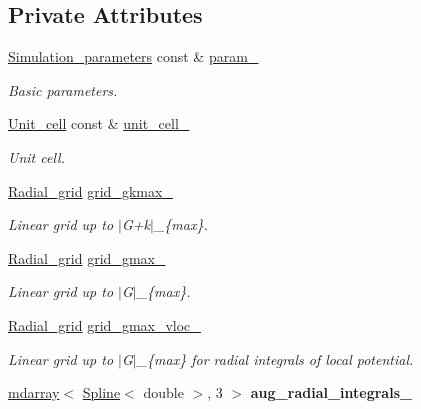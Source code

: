 \subsection*{Private Attributes}
\begin{DoxyCompactItemize}
\item 
\hyperlink{classsirius_1_1_simulation__parameters}{Simulation\+\_\+parameters} const \& \hyperlink{classsirius_1_1_radial__integrals_a88e8521b4204f08956b481ef8d4687c3}{param\+\_\+}
\begin{DoxyCompactList}\small\item\em Basic parameters. \end{DoxyCompactList}\item 
\hyperlink{classsirius_1_1_unit__cell}{Unit\+\_\+cell} const \& \hyperlink{classsirius_1_1_radial__integrals_ae644346b2e6a36a6c281ad577efcc5d8}{unit\+\_\+cell\+\_\+}
\begin{DoxyCompactList}\small\item\em Unit cell. \end{DoxyCompactList}\item 
\hyperlink{classsirius_1_1_radial__grid}{Radial\+\_\+grid} \hyperlink{classsirius_1_1_radial__integrals_ae8c8c5224d9b666532620614639d3d4d}{grid\+\_\+gkmax\+\_\+}
\begin{DoxyCompactList}\small\item\em Linear grid up to $\vert$\+G+k$\vert$\+\_\+\{max\}. \end{DoxyCompactList}\item 
\hyperlink{classsirius_1_1_radial__grid}{Radial\+\_\+grid} \hyperlink{classsirius_1_1_radial__integrals_a2012d496c3e7235c19f127bb9e69597f}{grid\+\_\+gmax\+\_\+}
\begin{DoxyCompactList}\small\item\em Linear grid up to $\vert$\+G$\vert$\+\_\+\{max\}. \end{DoxyCompactList}\item 
\hyperlink{classsirius_1_1_radial__grid}{Radial\+\_\+grid} \hyperlink{classsirius_1_1_radial__integrals_ad38cbd22cfa313f81cc5f83e9fc8c7fe}{grid\+\_\+gmax\+\_\+vloc\+\_\+}
\begin{DoxyCompactList}\small\item\em Linear grid up to $\vert$\+G$\vert$\+\_\+\{max\} for radial integrals of local potential. \end{DoxyCompactList}\item 
\hypertarget{classsirius_1_1_radial__integrals_a065b9b930b132125b262969e70b36fdf}{}\hyperlink{classsddk_1_1mdarray}{mdarray}$<$ \hyperlink{classsirius_1_1_spline}{Spline}$<$ double $>$, 3 $>$ {\bfseries aug\+\_\+radial\+\_\+integrals\+\_\+}\label{classsirius_1_1_radial__integrals_a065b9b930b132125b262969e70b36fdf}


\end{DoxyCompactItemize}
